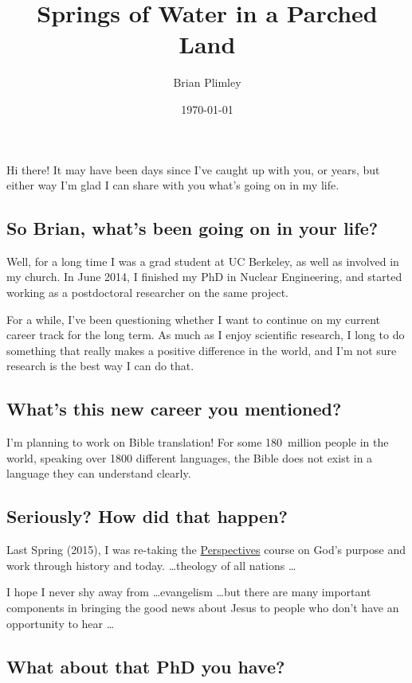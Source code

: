 \documentclass[letterpaper,twocolumn]{article}
\begin{document}
\title{Springs of Water in a Parched Land}
\author{Brian Plimley}
\date{\today}
\maketitle

\setcounter{secnumdepth}{0}	%

Hi there! It may have been days since I've caught up with you, or years, but either way I'm glad I can share with you what's going on in my life.

\subsection{So Brian, what's been going on in your life?}

Well, for a long time I was a grad student at UC Berkeley, as well as involved in my church. In June 2014, I finished my PhD in Nuclear Engineering, and started working as a postdoctoral researcher on the same project.

For a while, I've been questioning whether I want to continue on my current career track for the long term. As much as I enjoy scientific research, I long to do something that really makes a positive difference in the world, and I'm not sure research is the best way I can do that.

\subsection{What's this new career you mentioned?}

I'm planning to work on Bible translation! For some 180~million people in the world, speaking over 1800 different languages, the Bible does not exist in a language they can understand clearly.

\subsection{Seriously? How did that happen?}

Last Spring (2015), I was re-taking the \href{www.perspectives.org}{Perspectives} course on God's purpose and work through history and today. \ldots theology of all nations \ldots 

I hope I never shy away from \ldots evangelism \ldots but there are many important components in bringing the good news about Jesus to people who don't have an opportunity to hear \ldots

\subsection{What about that PhD you have?}
\end{document}
